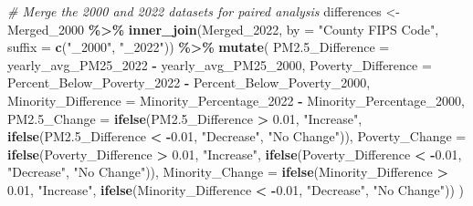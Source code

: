 \documentclass[
]{article}
\newenvironment{Shaded}{\begin{snugshade}}{\end{snugshade}}
\newcommand{\AttributeTok}[1]{\textcolor[rgb]{0.13,0.29,0.53}{#1}}
\newcommand{\CommentTok}[1]{\textcolor[rgb]{0.56,0.35,0.01}{\textit{#1}}}
\newcommand{\FloatTok}[1]{\textcolor[rgb]{0.00,0.00,0.81}{#1}}
\newcommand{\FunctionTok}[1]{\textcolor[rgb]{0.13,0.29,0.53}{\textbf{#1}}}
\newcommand{\NormalTok}[1]{#1}
\newcommand{\OtherTok}[1]{\textcolor[rgb]{0.56,0.35,0.01}{#1}}
\newcommand{\SpecialCharTok}[1]{\textcolor[rgb]{0.81,0.36,0.00}{\textbf{#1}}}
\newcommand{\StringTok}[1]{\textcolor[rgb]{0.31,0.60,0.02}{#1}}
\begin{document}
\begin{Shaded}
\begin{Highlighting}[]
\CommentTok{\# Merge the 2000 and 2022 datasets for paired analysis}
\NormalTok{differences }\OtherTok{\textless{}{-}}\NormalTok{ Merged\_2000 }\SpecialCharTok{\%\textgreater{}\%}
  \FunctionTok{inner\_join}\NormalTok{(Merged\_2022, }\AttributeTok{by =} \StringTok{"County FIPS Code"}\NormalTok{, }\AttributeTok{suffix =} \FunctionTok{c}\NormalTok{(}\StringTok{"\_2000"}\NormalTok{, }\StringTok{"\_2022"}\NormalTok{)) }\SpecialCharTok{\%\textgreater{}\%}
  \FunctionTok{mutate}\NormalTok{(}
    \AttributeTok{PM2.5\_Difference =}\NormalTok{ yearly\_avg\_PM25\_2022 }\SpecialCharTok{{-}}\NormalTok{ yearly\_avg\_PM25\_2000,}
    \AttributeTok{Poverty\_Difference =}\NormalTok{ Percent\_Below\_Poverty\_2022 }\SpecialCharTok{{-}}\NormalTok{ Percent\_Below\_Poverty\_2000,}
    \AttributeTok{Minority\_Difference =}\NormalTok{ Minority\_Percentage\_2022 }\SpecialCharTok{{-}}\NormalTok{ Minority\_Percentage\_2000,}
    \AttributeTok{PM2.5\_Change =} \FunctionTok{ifelse}\NormalTok{(PM2}\FloatTok{.5}\NormalTok{\_Difference }\SpecialCharTok{\textgreater{}} \FloatTok{0.01}\NormalTok{, }\StringTok{"Increase"}\NormalTok{,}
                          \FunctionTok{ifelse}\NormalTok{(PM2}\FloatTok{.5}\NormalTok{\_Difference }\SpecialCharTok{\textless{}} \SpecialCharTok{{-}}\FloatTok{0.01}\NormalTok{, }\StringTok{"Decrease"}\NormalTok{, }\StringTok{"No Change"}\NormalTok{)),}
    \AttributeTok{Poverty\_Change =} \FunctionTok{ifelse}\NormalTok{(Poverty\_Difference }\SpecialCharTok{\textgreater{}} \FloatTok{0.01}\NormalTok{, }\StringTok{"Increase"}\NormalTok{,}
                            \FunctionTok{ifelse}\NormalTok{(Poverty\_Difference }\SpecialCharTok{\textless{}} \SpecialCharTok{{-}}\FloatTok{0.01}\NormalTok{, }\StringTok{"Decrease"}\NormalTok{, }\StringTok{"No Change"}\NormalTok{)),}
    \AttributeTok{Minority\_Change =} \FunctionTok{ifelse}\NormalTok{(Minority\_Difference }\SpecialCharTok{\textgreater{}} \FloatTok{0.01}\NormalTok{, }\StringTok{"Increase"}\NormalTok{,}
                             \FunctionTok{ifelse}\NormalTok{(Minority\_Difference }\SpecialCharTok{\textless{}} \SpecialCharTok{{-}}\FloatTok{0.01}\NormalTok{, }\StringTok{"Decrease"}\NormalTok{, }\StringTok{"No Change"}\NormalTok{))}
\NormalTok{  )}



\end{Highlighting}
\end{Shaded}
\end{document}
